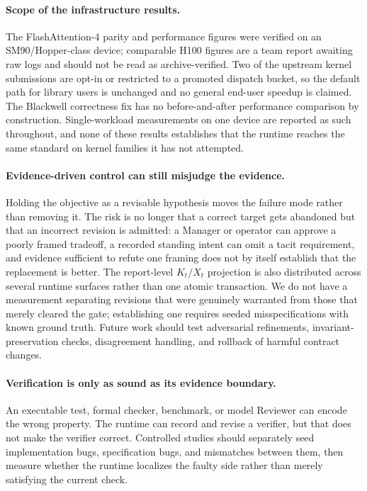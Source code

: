\paragraph{Scope of the infrastructure results.}
The FlashAttention-4 parity and performance figures were verified on an
SM90/Hopper-class device; comparable H100 figures are a team report awaiting raw
logs and should not be read as archive-verified. Two of the upstream kernel
submissions are opt-in or restricted to a promoted dispatch bucket, so the default
path for library users is unchanged and no general end-user speedup is claimed. The
Blackwell correctness fix has no before-and-after performance comparison by
construction. Single-workload measurements on one device are reported as such
throughout, and none of these results establishes that the runtime reaches the same
standard on kernel families it has not attempted.

\paragraph{Evidence-driven control can still misjudge the evidence.}
Holding the objective as a revisable hypothesis moves the failure mode rather than
removing it. The risk is no longer that a correct target gets abandoned but that an
incorrect revision is admitted: a Manager or operator can approve a poorly framed
tradeoff, a recorded standing intent can omit a tacit requirement, and evidence
sufficient to refute one framing does not by itself establish that the replacement is
better. The report-level $K_t/X_t$ projection is also distributed across several
runtime surfaces rather than one atomic transaction. We do not have a measurement
separating revisions that were genuinely warranted from those that merely cleared the
gate; establishing one requires seeded misspecifications with known ground truth.
Future work should test adversarial refinements, invariant-preservation checks,
disagreement handling, and rollback of harmful contract changes.

\paragraph{Verification is only as sound as its evidence boundary.}
An executable test, formal checker, benchmark, or model Reviewer can encode the
wrong property. The runtime can record and revise a verifier, but that does not make
the verifier correct. Controlled studies should separately seed implementation
bugs, specification bugs, and mismatches between them, then measure whether the
runtime localizes the faulty side rather than merely satisfying the current check.

